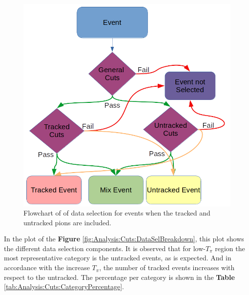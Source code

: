 \begin{figure}[!htb]
    \centering
    \includegraphics[scale=0.4]{Figures/Chapter4/DataSelection/EventSelFlowchart.png}
    \caption{Flowchart of of data selection for events when the tracked and untracked pions are included.}
    \label{fig:Analysis:Cuts:Flowchart}
\end{figure}

In the plot of the \textbf{Figure} \ref{fig:Analysis:Cuts:DataSelBreakdown}, this plot shows the different data selection components. It is observed that for low-$T_\pi$ region the most representative category is the untracked events, as is expected. And in accordance with the increase $T_\pi$, the number of tracked events increases with respect to the untracked. The percentage per category is shown in the \textbf{Table} \ref{tab:Analysis:Cuts:CategoryPercentage}.

